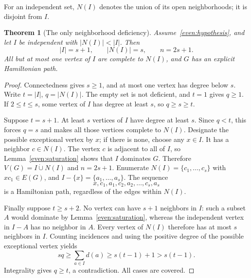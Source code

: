 \documentclass[11pt,a4paper]{article}
\newtheorem{theorem}{Theorem}[section]
\theoremstyle{definition}\newtheorem{definition}[theorem]{Definition}
\theoremstyle{remark}\newtheorem{remark}[theorem]{Remark}
\begin{document}
For an independent set, $N(I)$ denotes the union of its open
neighborhoods; it is disjoint from $I$.
\begin{theorem}[The only neighborhood deficiency]\label{even:deficiency}
Assume~\eqref{even:hypothesis}, and let $I$ be independent with
$|N(I)|<|I|$. Then
\[
 |I|=s+1,\qquad |N(I)|=s,\qquad n=2s+1.
\]
All but at most one vertex of $I$ are complete to $N(I)$, and $G$ has
an explicit Hamiltonian path.
\end{theorem}
\begin{proof}
Connectedness gives $s\ge1$, and at most one vertex has degree below
$s$. Write $t=|I|$, $q=|N(I)|$. The empty set is not deficient, and
$t=1$ gives $q\ge1$. If $2\le t\le s$, some vertex of $I$ has degree
at least $s$, so $q\ge s\ge t$.

Suppose $t=s+1$. At least $s$ vertices of $I$ have degree at least
$s$. Since $q<t$, this forces $q=s$ and makes all those vertices
complete to $N(I)$. Designate the possible exceptional vertex by $x$;
if there is none, choose any $x\in I$. It has a neighbor $c\in N(I)$.
The vertex $c$ is adjacent to all of $I$, so Lemma~\ref{even:saturation}
shows that $I$ dominates $G$. Therefore $V(G)=I\mathbin{\dot\cup}N(I)$
and $n=2s+1$. Enumerate $N(I)=\{c_1,\ldots,c_s\}$ with $xc_1\in E(G)$,
and $I-\{x\}=\{a_1,\ldots,a_s\}$. The sequence
\[
 x,c_1,a_1,c_2,a_2,\ldots,c_s,a_s
\]
is a Hamiltonian path, regardless of the edges within $N(I)$.

Finally suppose $t\ge s+2$. No vertex can have $s+1$ neighbors in
$I$: such a subset $A$ would dominate by Lemma~\ref{even:saturation},
whereas the independent vertex in $I-A$ has no neighbor in $A$.
Every vertex of $N(I)$ therefore has at most $s$ neighbors in $I$.
Counting incidences and using the positive degree of the possible
exceptional vertex yields
\[
 sq\ge\sum_{a\in I}d(a)\ge s(t-1)+1>s(t-1).
\]
Integrality gives $q\ge t$, a contradiction. All cases are covered.
\end{proof}
\end{document}
